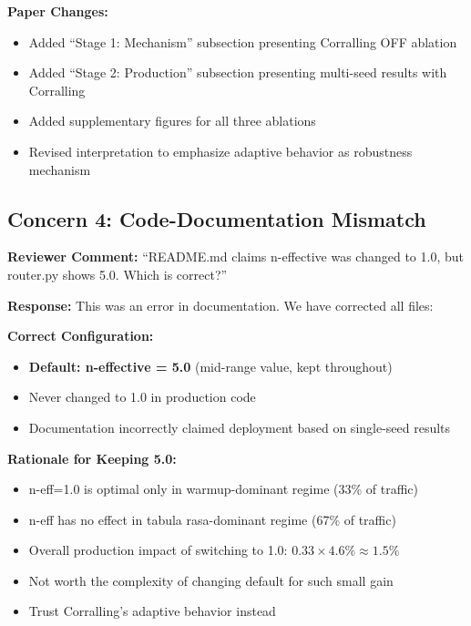 \textbf{Paper Changes:}
\begin{itemize}[leftmargin=*, itemsep=2pt]
    \item Added ``Stage 1: Mechanism'' subsection presenting Corralling OFF ablation
    \item Added ``Stage 2: Production'' subsection presenting multi-seed results with Corralling
    \item Added supplementary figures for all three ablations
    \item Revised interpretation to emphasize adaptive behavior as robustness mechanism
\end{itemize}


\subsection*{Concern 4: Code-Documentation Mismatch}

\textbf{Reviewer Comment:} ``README.md claims n-effective was changed to 1.0, but router.py shows 5.0. Which is correct?''

\textbf{Response:} This was an error in documentation. We have corrected all files:

\textbf{Correct Configuration:}
\begin{itemize}[leftmargin=*, itemsep=2pt]
    \item \textbf{Default: n-effective = 5.0} (mid-range value, kept throughout)
    \item Never changed to 1.0 in production code
    \item Documentation incorrectly claimed deployment based on single-seed results
\end{itemize}

\textbf{Rationale for Keeping 5.0:}
\begin{itemize}[leftmargin=*, itemsep=2pt]
    \item n-eff=1.0 is optimal only in warmup-dominant regime (33\% of traffic)
    \item n-eff has no effect in tabula rasa-dominant regime (67\% of traffic)
    \item Overall production impact of switching to 1.0: $0.33 \times 4.6\% \approx 1.5\%$
    \item Not worth the complexity of changing default for such small gain
    \item Trust Corralling's adaptive behavior instead
\end{itemize}

